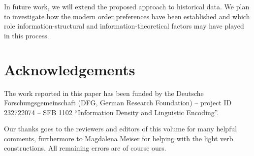 \documentclass[output=paper,colorlinks,citecolor=brown]{langscibook}
\begin{document}
In future work, we will extend the proposed approach to historical data. 
We plan to investigate how the modern order preferences have been established and which role information-structural and information-theoretical factors may have played in this process.

\section*{Acknowledgements}

The work reported in this paper has been funded by the Deutsche Forschungsgemeinschaft (DFG, German Research Foundation) -- project ID 232722074 -- SFB 1102 ``Information Density and Linguistic Encoding''.

Our thanks goes to the reviewers and editors of this volume for many helpful comments, furthermore to Magdalena Meiser for helping with the light verb constructions. All remaining errors are of course ours.

\printbibliography[heading=subbibliography,notkeyword=this]
\end{document}
